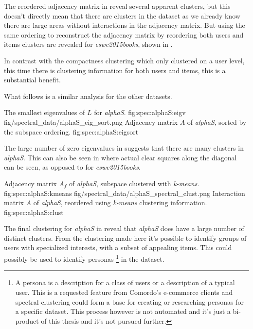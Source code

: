 \FloatBarrier

The reordered adjacency matrix in  reveal several apparent clusters, but this doesn't directly mean that there are clusters in the dataset as we already know there are large areas without interactions in the adjacency matrix. But using the same ordering to reconstruct the adjacency matrix by reordering both users and items clusters are revealed for \textit{eswc2015books}, shown in .

In contrast with the compactness clustering which only clustered on a user level, this time there is clustering information for both users and items, this is a substantial benefit.

What follows is a similar analysis for the other datasets.

\FloatBarrier

{The smallest eigenvalues of $L$ for \textit{alphaS}.}
{fig:spec:alphaS:eigv}
{fig/spectral_data/alphaS_eig_sort.png}
{Adjacency matrix $A$ of \textit{alphaS}, sorted by the subspace ordering.}
{fig:spec:alphaS:eigsort}

The large number of zero eigenvalues in  suggests that there are many clusters in \textit{alphaS}. This can also be seen in  where actual clear squares along the diagonal can be seen, as opposed to  for \textit{eswc2015books}.

{Adjacency matrix $A_f$ of \textit{alphaS}, subspace clustered with \textit{k-means}.}
{fig:spec:alphaS:kmeans}
{fig/spectral_data/alphaS_spectral_clust.png}
{Interaction matrix $A$ of \textit{alphaS}, reordered using \textit{k-means} clustering information.}
{fig:spec:alphaS:clust}

\FloatBarrier

The final clustering for \textit{alphaS} in  reveal that \textit{alphaS} does have a large number of distinct clusters.  From the clustering made here it's possible to identify groups of users with specialized interests, with a subset of appealing items. This could possibly be used to identify personas
\footnote{
A persona is a description for a class of users or a description of a typical user.
This is a requested feature from Comordo's e-commerce clients and spectral clustering could form a base for creating or researching personas for a specific dataset. This process however is not automated and it's just a bi-product of this thesis and it's not pursued further.
}
in the dataset.

